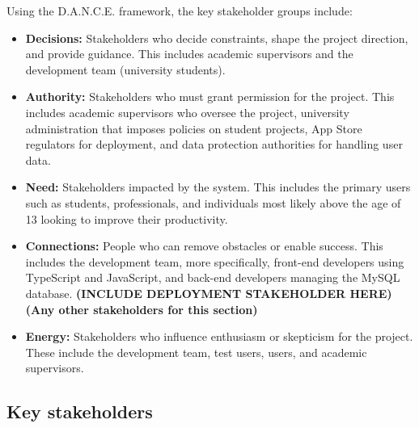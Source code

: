 Using the D.A.N.C.E. framework, the key stakeholder groups include:
\begin{itemize}
    \item \textbf{Decisions:} Stakeholders who decide constraints, shape the project direction, and provide guidance. This includes academic supervisors and the development team (university students).

    \item \textbf{Authority:} Stakeholders who must grant permission for the project. This includes academic supervisors who oversee the project, university administration that imposes policies on student projects, App Store regulators for deployment, and data protection authorities for handling user data.

    \item \textbf{Need:} Stakeholders impacted by the system. This includes the primary users such as students, professionals, and individuals most likely above the age of 13 looking to improve their productivity.

    \item \textbf{Connections:} People who can remove obstacles or enable success. This includes the development team, more specifically, front-end developers using TypeScript and JavaScript, and back-end developers managing the MySQL database. \textbf{(INCLUDE DEPLOYMENT STAKEHOLDER HERE)} \textbf{(Any other stakeholders for this section)}

    \item \textbf{Energy:} Stakeholders who influence enthusiasm or skepticism for the project. These include the development team, test users, users, and academic supervisors.
\end{itemize}

\subsection{Key stakeholders}
